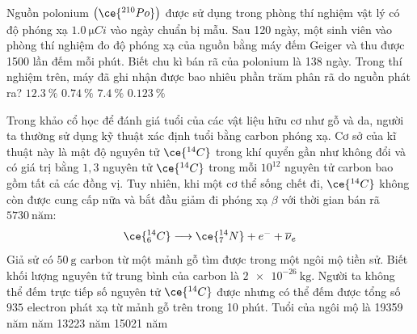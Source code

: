 \begin{ex}
	Nguồn polonium $\left(\ce{^{210}Po}\right)$ được sử dụng trong phòng thí nghiệm vật lý có độ phóng xạ $\SI{1.0}{\micro Ci}$ vào ngày chuẩn bị mẫu. Sau 120 ngày, một sinh viên vào phòng thí nghiệm đo độ phóng xạ của nguồn bằng máy đếm Geiger và thu được 1500 lần đếm mỗi phút. Biết chu kì bán rã của polonium là 138 ngày. Trong thí nghiệm trên, máy đã ghi nhận được bao nhiêu phần trăm phân rã do nguồn phát ra?
	\choice
	{$\SI{12.3}{\percent}$}
	{$\SI{0.74}{\percent}$}
	{$\SI{7.4}{\percent}$}
	{\True $\SI{0.123}{\percent}$}
\end{ex}
\begin{ex}
	Trong khảo cổ học để đánh giá tuổi của các vật liệu hữu cơ như gỗ và da, người ta thường sử dụng kỹ thuật xác định tuổi bằng carbon phóng xạ. Cơ sở của kĩ thuật này là mật độ  nguyên tử $\ce{^{14}C}$ trong khí quyển gần như không đổi và có giá trị bằng $1,3$ nguyên tử $\ce{^{14}C}$ trong mỗi $10^{12}$ nguyên tử carbon bao gồm tất cả các đồng vị. Tuy nhiên, khi một cơ thể sống chết đi, $\ce{^{14}C}$ không còn được cung cấp nữa và bắt đầu giảm đi phóng xạ $\beta$ với thời gian bán rã $\SI{5730}{\text{năm}}$:
	$$\ce{^{14}_6C}\longrightarrow \ce{^{14}_7N}+e^{-}+\overline{\nu}_e$$
	Giả sử có $\SI{50}{\gram}$ carbon từ một mảnh gỗ tìm được trong một ngôi mộ tiền sử. Biết khối lượng nguyên tử trung bình của carbon là $\SI{2e-26}{\kilogram}$. Người ta không thể đếm trực tiếp số nguyên tử $\ce{^{14}C}$ được nhưng có thể đếm được tổng số $935$ electron phát xạ từ mảnh gỗ trên trong 10 phút. Tuổi của ngôi mộ là
	\choice
	{19359 năm}
	{ năm}
	{13223 năm}
	{15021 năm}
\end{ex}

